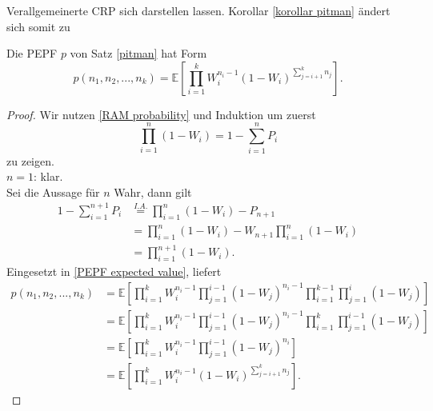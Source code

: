 \begin{section}{Verallgemeinerte CRP}
sich darstellen lassen. Korollar \ref{korollar pitman} ändert sich somit zu
\begin{Korollar}
    \label{second korollar Pitman}
    Die PEPF $p$ von Satz \ref{pitman} hat Form
    \[
    p(n_1,n_2,...,n_k) = \mathbb{E}\left[\prod_{i=1}^{k}W_i^{n_i-1}(1-W_i)^{\sum_{j=i+1}^{k}n_j}\right].
    \]
\end{Korollar}
\begin{proof}
   Wir nutzen \ref{RAM probability} und Induktion um zuerst
   \[
    \prod_{i=1}^{n}(1-W_i) = 1 - \sum_{i=1}^{n}P_i
   \] 
   zu zeigen.\\
   $n = 1$: klar. \\
   Sei die Aussage für $n$ Wahr, dann gilt 
   \begin{align*}
    1 - \sum_{i=1}^{n+1}P_i &\overset{I.A.}{=} \prod_{i=1}^{n}(1-W_i) - P_{n+1}\\
    &=  \prod_{i=1}^{n}(1-W_i) - W_{n+1}\prod_{i=1}^{n}(1-W_i) \\
    &= \prod_{i=1}^{n+1}(1-W_i).
   \end{align*}
   Eingesetzt in \ref{PEPF expected value}, liefert 
   \begin{align*}
    p(n_1,n_2,...,n_k) &= \mathbb{E}\left[\prod_{i=1}^{k}W_i^{n_i-1}\prod_{j=1}^{i-1}(1-W_j)^{n_i-1}\prod_{i=1}^{k-1}\prod_{j=1}^{i}(1-W_j)\right]\\
    &= \mathbb{E}\left[\prod_{i=1}^{k}W_i^{n_i-1}\prod_{j=1}^{i-1}(1-W_j)^{n_i-1}\prod_{i=1}^{k}\prod_{j=1}^{i-1}(1-W_j)\right]\\
    &= \mathbb{E}\left[\prod_{i=1}^{k}W_i^{n_i-1}\prod_{j=1}^{i-1}(1-W_j)^{n_i}\right]\\
    &=\mathbb{E}\left[\prod_{i=1}^{k}W_i^{n_i-1}(1-W_i)^{\sum_{j=i+1}^{k}n_j}\right].
   \end{align*}  


\end{proof}
\end{section}

